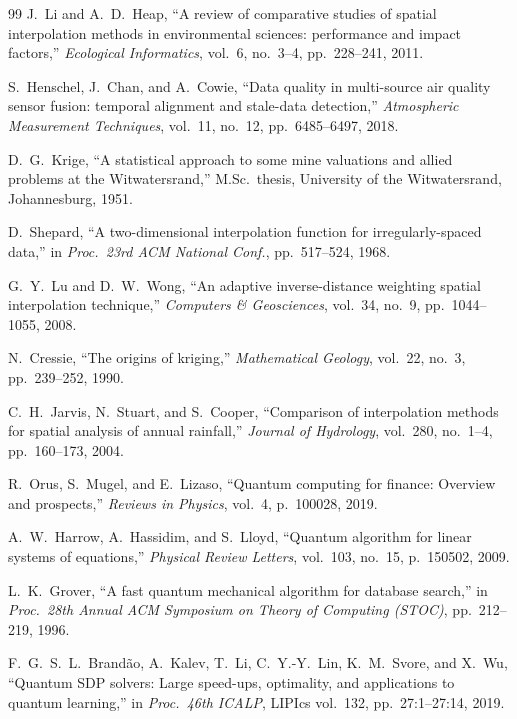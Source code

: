 \documentclass[12pt,a4paper]{article}
\begin{document}
\begin{thebibliography}{99}
J.\ Li and A.\ D.\ Heap,
``A review of comparative studies of spatial interpolation methods in
environmental sciences: performance and impact factors,''
\emph{Ecological Informatics}, vol.\ 6, no.\ 3--4, pp.\ 228--241, 2011.

S.\ Henschel, J.\ Chan, and A.\ Cowie,
``Data quality in multi-source air quality sensor fusion: temporal
alignment and stale-data detection,''
\emph{Atmospheric Measurement Techniques}, vol.\ 11, no.\ 12,
pp.\ 6485--6497, 2018.

D.\ G.\ Krige,
``A statistical approach to some mine valuations and allied problems
at the Witwatersrand,''
M.Sc.\ thesis, University of the Witwatersrand, Johannesburg, 1951.

D.\ Shepard,
``A two-dimensional interpolation function for irregularly-spaced data,''
in \emph{Proc.\ 23rd ACM National Conf.}, pp.\ 517--524, 1968.

G.\ Y.\ Lu and D.\ W.\ Wong,
``An adaptive inverse-distance weighting spatial interpolation technique,''
\emph{Computers \& Geosciences}, vol.\ 34, no.\ 9, pp.\ 1044--1055, 2008.

N.\ Cressie,
``The origins of kriging,''
\emph{Mathematical Geology}, vol.\ 22, no.\ 3, pp.\ 239--252, 1990.

C.\ H.\ Jarvis, N.\ Stuart, and S.\ Cooper,
``Comparison of interpolation methods for spatial analysis of annual rainfall,''
\emph{Journal of Hydrology}, vol.\ 280, no.\ 1--4, pp.\ 160--173, 2004.

R.\ Orus, S.\ Mugel, and E.\ Lizaso,
``Quantum computing for finance: Overview and prospects,''
\emph{Reviews in Physics}, vol.\ 4, p.\ 100028, 2019.

A.\ W.\ Harrow, A.\ Hassidim, and S.\ Lloyd,
``Quantum algorithm for linear systems of equations,''
\emph{Physical Review Letters}, vol.\ 103, no.\ 15, p.\ 150502, 2009.

L.\ K.\ Grover,
``A fast quantum mechanical algorithm for database search,''
in \emph{Proc.\ 28th Annual ACM Symposium on Theory of Computing (STOC)},
pp.\ 212--219, 1996.

F.\ G.\ S.\ L.\ Brand\~ao, A.\ Kalev, T.\ Li, C.\ Y.-Y.\ Lin,
K.\ M.\ Svore, and X.\ Wu,
``Quantum SDP solvers: Large speed-ups, optimality, and applications
to quantum learning,''
in \emph{Proc.\ 46th ICALP}, LIPIcs vol.\ 132, pp.\ 27:1--27:14, 2019.


\end{thebibliography}
\end{document}
